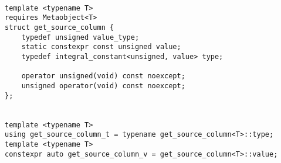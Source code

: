 \begin{verbatim}

template <typename T>
requires Metaobject<T>
struct get_source_column {
	typedef unsigned value_type;
	static constexpr const unsigned value;
	typedef integral_constant<unsigned, value> type;

	operator unsigned(void) const noexcept;
	unsigned operator(void) const noexcept;
};


template <typename T>
using get_source_column_t = typename get_source_column<T>::type;
template <typename T>
constexpr auto get_source_column_v = get_source_column<T>::value;

\end{verbatim}
